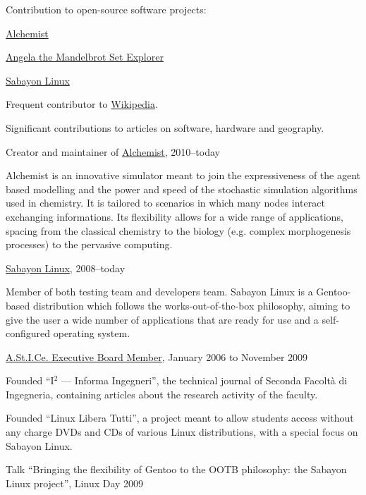\documentclass[10pt]{article}
\renewcommand{\section}[2]%
        {\pagebreak[3]\vspace{1.3\baselineskip}%
         \phantomsection\addcontentsline{toc}{section}{#1}%
         \hspace{0in}%
         \marginpar{
         \raggedright \scshape #1}#2}
\newenvironment{innerlist}[1][\enskip\textbullet]%
        {\begin{compactitem}[#1]}{\end{compactitem}}
\newcommand{\halfblankline}{\quad\vspace{-0.5\baselineskip}\pagebreak[3]}
\begin{document}
\section{Service}
Contribution to open-source software projects:
\begin{innerlist}
    \item \href{http://alchemist.apice.unibo.it/}{Alchemist}
    \item \href{http://mandelbrot.sourceforge.net/}{Angela the Mandelbrot Set Explorer}
    \item \href{http://www.sabayon.org/}{Sabayon Linux}
\end{innerlist}
\halfblankline

Frequent contributor to \href{http://www.wikipedia.org/}{Wikipedia}.
\begin{innerlist}
    \item Significant contributions to articles on software, hardware and geography.
\end{innerlist}
\halfblankline

Creator and maintainer of \href{http://alchemist.apice.unibo.it/}{Alchemist}, 2010--today
\begin{innerlist}
    \item Alchemist is an innovative simulator meant to join the expressiveness of the agent based modelling and the power and speed of the stochastic simulation algorithms used in chemistry. It is tailored to scenarios in which many nodes interact exchanging  informations. Its flexibility allows for a wide range of applications, spacing from the classical chemistry to the biology (e.g. complex morphogenesis processes) to the pervasive computing.
\end{innerlist}
\halfblankline

\href{http://www.sabayon.org/}{Sabayon Linux}, 2008--today
\begin{innerlist}
  \item Member of both testing team and developers team. Sabayon Linux is a Gentoo-based distribution which follows the works-out-of-the-box philosophy, aiming to give the user a wide number of applications that are ready for use and a self-configured operating system.
\end{innerlist}
\halfblankline

\href{http://www.astice.org/}{A.St.I.Ce. Executive Board Member}, January 2006 to November 2009
    \begin{innerlist}
      \item Founded ``I$^2$ --- Informa Ingegneri'', the technical journal of Seconda Facoltà di Ingegneria, containing articles about the research activity of the faculty.
      \item Founded ``Linux Libera Tutti'', a project meant to allow students access without any charge DVDs and CDs of various Linux distributions, with a special focus on Sabayon Linux.
      \item Talk ``Bringing the flexibility of Gentoo to the OOTB philosophy: the Sabayon Linux project'', Linux Day 2009
    \end{innerlist}
\halfblankline
\end{document}
